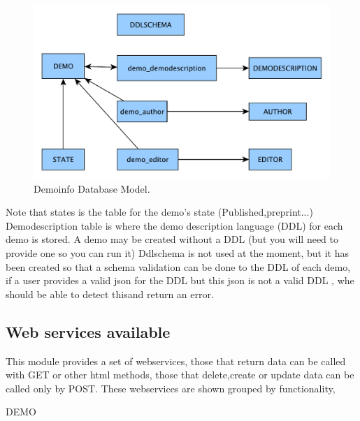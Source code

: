 \begin{figure}[!ht]
\centering
\includegraphics[width=0.5\columnwidth]{demo_info/images/demoinfo_model.pdf}
\caption{Demoinfo Database Model.} 
\label{fig:demoinfo_model}
\end{figure}

Note that states is the table for the demo's state (Published,preprint...)
Demodescription table is where the demo description language (DDL) for each demo is stored.
A demo may be created without a DDL (but you will need to provide one so you can run it)
Ddlschema is not used at the moment, but it has been created so that a schema validation can be done to the DDL of each demo, if a user provides a valid json for the DDL but this json is not a valid DDL , whe should be able to detect thisand return an error.

\subsection{Web services available}
This module provides a set of webservices, those that return data can be called with GET or other html methods, those that delete,create or update data can be called only by POST.
These webservices are shown grouped by functionality, 


DEMO

